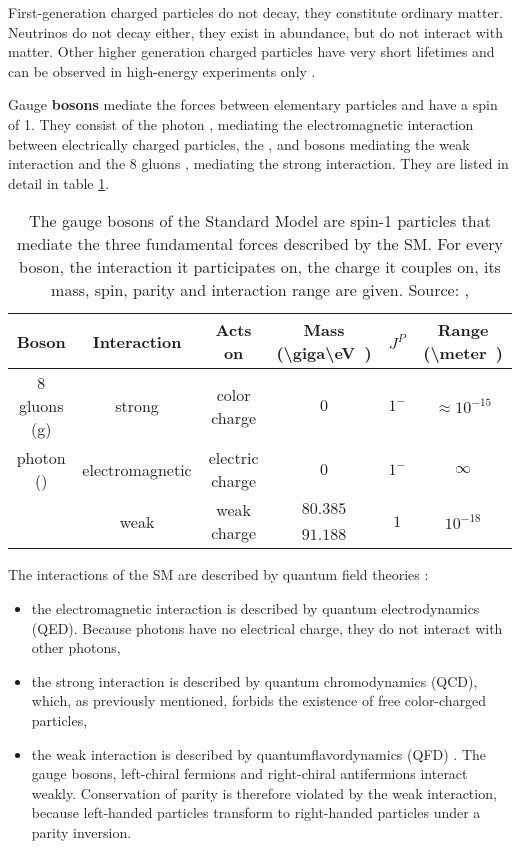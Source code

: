 First-generation charged particles do not decay, they constitute ordinary matter. Neutrinos do not decay either, they exist in abundance, but do not interact with matter. Other higher generation charged particles have very short lifetimes and can be observed in high-energy experiments only \cite{wiki:standardmodel}.

Gauge \textbf{bosons} mediate the forces between elementary particles and have a spin of 1. They consist of the photon \Pgg, mediating the electromagnetic interaction between electrically charged particles, the \PWp, \PWm and \PZ bosons mediating the weak interaction and the 8 gluons \Pgluon, mediating the strong interaction. They are listed in detail in table \ref{tab:ch_1_sm_bosons}.

\begin{table}[h]
	\caption[Gauge bosons of the Standard Model]{The gauge bosons of the Standard Model are spin-1 particles that mediate the three fundamental forces described by the SM. For every boson, the interaction it participates on, the charge it couples on, its mass, spin, parity and interaction range are given. Source: \cite{Pov14}, \cite{Fal18}}
	\label{tab:ch_1_sm_bosons}
	\begin{center}
    	\begin{tabular}{cccccc}
    		\toprule
    		Boson & Interaction & Acts on & Mass (\SI[parse-numbers = false]{\giga\eV}) & {$J^P$} & Range (\SI[parse-numbers = false]{\meter})\\
    		\midrule
    		8 gluons (g) & strong & color charge & {$0$} & {$1^-$} & $\approx 10^{-15}$\\
    		photon (\Pphoton) & electromagnetic & electric charge & {$0$} & {$1^-$} & {$\infty$}\\
    		\PWpm & \multirow{2}{*}{weak} &\multirow{2}{*}{weak charge} & {$80.385$} & \multirow{2}{*}{$1$} & \multirow{2}{*}{$10^{-18}$}\\
    		\PZz & & & {$91.188$} & &\\
    		\bottomrule
    	\end{tabular}
	\end{center}
\end{table}

The interactions of the SM are described by quantum field theories \cite{Wel17}:
\begin{itemize}
\item the electromagnetic interaction is described by quantum electrodynamics (QED). Because photons have no electrical charge, they do not interact with other photons,
\item the strong interaction is described by quantum chromodynamics (QCD), which, as previously mentioned, forbids the existence of free color-charged particles,
\item the weak interaction is described by quantumflavordynamics (QFD) \cite{Gri08}. The gauge bosons, left-chiral fermions and right-chiral antifermions interact weakly. Conservation of parity is therefore violated by the weak interaction, because left-handed particles transform to right-handed particles under a parity inversion.
\end{itemize}

